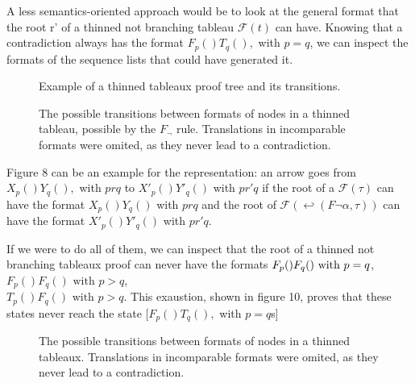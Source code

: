 \documentclass[runningheads]{llncs}
\begin{document}
 A less semantics-oriented approach would be to look at the general format that the root r' of a thinned not branching tableau $\mathcal{F}(t)$ can have. Knowing 
 that a contradiction always has the format  
 $F_p ( ) T_q ( ), $ with $ p = q$, 
 we can inspect the formats of the sequence lists that could have generated it.

 \begin{figure}
    \thinnedExampleImageI
    \thinnedExampleImageII
    \caption{Example of a thinned tableaux proof tree and its transitions.}
 \end{figure}

 \begin{figure}
 \nnn
 \caption{The possible transitions between formats of nodes in a thinned tableau, possible by the $F_\neg$ rule. Translations in incomparable formats were omited, as they never lead to a contradiction.}
 \label{figureneg}
 \end{figure}

 Figure 8 can be an example for the representation: an arrow goes from $X_p () Y_q (), $ with $ p r q $ to $X'_p () Y'_q ()  $ with $ p r' q $ if the root of a $\mathcal{F}(\tau)$ can have the format $X_p () Y_q ()  $ with $ p r q $
  and the root of $\mathcal{F}(\hookleftarrow(F \neg \alpha ,\tau))$
 can have the format $X'_p () Y'_q () $ with $ p r' q $. 

     

If we were to do all of them, we can inspect that the root  of a thinned not branching tableaux proof can never have 
the formats $\\ F_p () F_q () \text{ with }  p=q$, \\ $F_p () F_q ()  \text{ with }  p>q$, \\$T_p () F_q () \text{ with } p>q$.
This exaustion, shown in figure 10, proves that these states never reach the state [$F_p ( ) T_q ( ), $ with $ p = q$s]

\begin{figure}
    \fs
    \caption{The possible transitions between formats of nodes in a thinned tableaux. Translations in incomparable formats were omited, as they never lead to a contradiction.}
    \label{figuretotal}
\end{figure}
\end{document}
